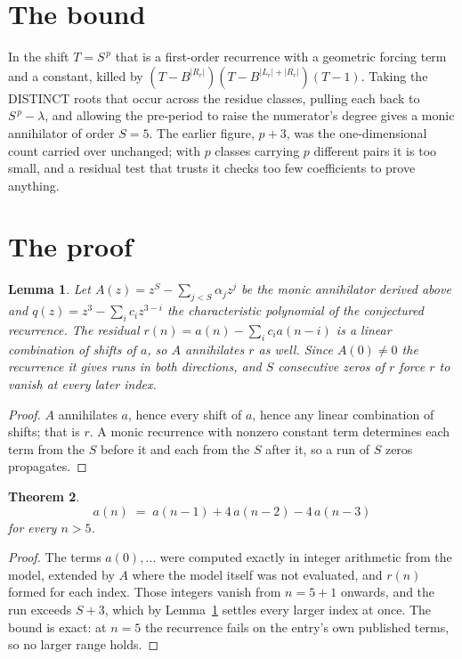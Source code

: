 \documentclass[11pt,a4paper]{article}
\theoremstyle{plain}
\newtheorem{theorem}{Theorem}
\newtheorem{lemma}[theorem]{Lemma}
\theoremstyle{definition}
\begin{document}
\section{The bound}

In the shift $T=S^{\,p}$ that is a first-order recurrence with a geometric forcing term and a
constant, killed by $(T-B^{|R_r|})(T-B^{|L_r|+|R_r|})(T-1)$. Taking the DISTINCT roots that
occur across the residue classes, pulling each back to $S^{\,p}-\lambda$, and allowing the
pre-period to raise the numerator's degree gives a monic annihilator of order $S=5$. The
earlier figure, $p+3$, was the one-dimensional count carried over unchanged; with $p$ classes
carrying $p$ different pairs it is too small, and a residual test that trusts it checks too few
coefficients to prove anything.

\section{The proof}

\begin{lemma}\label{lem:crit}
Let $A(z)=z^S-\sum_{j<S}\alpha_jz^{j}$ be the monic annihilator derived above and
$q(z)=z^{3}-\sum_ic_iz^{3-i}$ the characteristic polynomial of the conjectured
recurrence. The residual $r(n)=a(n)-\sum_ic_ia(n-i)$ is a linear combination of shifts of $a$,
so $A$ annihilates $r$ as well. Since $A(0)\ne0$ the recurrence it gives runs in both
directions, and $S$ consecutive zeros of $r$ force $r$ to vanish at every later index.
\end{lemma}

\begin{proof}
$A$ annihilates $a$, hence every shift of $a$, hence any linear combination of shifts; that is
$r$. A monic recurrence with nonzero constant term determines each term from the $S$ before it
and each from the $S$ after it, so a run of $S$ zeros propagates.
\end{proof}

\begin{theorem}
\[
a(n)\;=\;a(n-1) + 4\,a(n-2) - 4\,a(n-3)
\]
for every $n>5$.
\end{theorem}

\begin{proof}
The terms $a(0),\dots$ were computed exactly in integer arithmetic from the model, extended by
$A$ where the model itself was not evaluated, and $r(n)$ formed for each index. Those integers
vanish from $n=5+1$ onwards, and the run exceeds $S+3$, which by
Lemma~\ref{lem:crit} settles every larger index at once. The bound is exact: at $n=5$ the recurrence fails on the entry's own published terms, so no larger range holds.
\end{proof}
\end{document}
